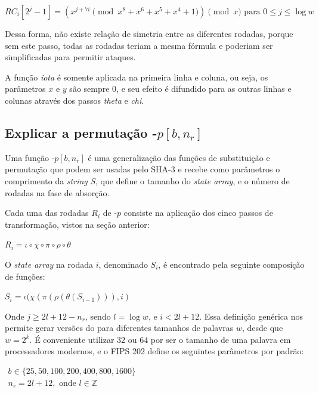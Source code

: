 $RC_{i}[2^{j}-1] = (x^{j+7i} \pmod{x^8 + x^6 + x^5 + x^4 + 1}) \pmod{x} \mbox{ para } 0 \leq j \leq \log w$

Dessa forma, não existe relação de simetria entre as diferentes rodadas, porque
sem este passo, todas as rodadas teriam a mesma fórmula e poderiam ser
simplificadas para permitir ataques.

A função \textit{iota} é somente aplicada na primeira linha e coluna, ou seja,
os parâmetros $x$ e $y$ são sempre 0, e seu efeito é difundido para as outras
linhas e colunas através dos passos \textit{theta} e \textit{chi}.

\subsection{Explicar a permutação \Keccak-$p[b,n_r]$}

Uma função \Keccak-$p[b, n_r]$ é uma generalização das funções de substituição
e permutação \Keccak{} que podem ser usadas pelo SHA-3 e recebe como parâmetros o
comprimento da \textit{string} $S$, que define o tamanho do
\textit{state array}, e o número de rodadas na fase de absorção.

Cada uma das rodadas $R_{i}$ de \Keccak-$p$ consiste na aplicação dos cinco
passos de transformação, vistos na seção anterior:

\begin{center}
    $R_{i} = \iota \circ \chi \circ \pi \circ \rho \circ \theta$
\end{center}

O \textit{state array} na rodada $i$, denominado $S_{i}$, é encontrado pela
seguinte composição de funções:

\begin{center}
    $S_{i} = \iota(\chi(\pi(\rho(\theta(S_{i-1}))), i)$
\end{center}

Onde $j \geq 2l + 12 - n_r$, sendo $l = \log w$, e $i < 2l + 12$. Essa
definição genérica nos permite gerar versões do \Keccak{} para diferentes
tamanhos de palavras $w$, desde que $w = 2^{k}$. É conveniente utilizar $32$ ou
$64$ por ser o tamanho de uma palavra em processadores modernos, e o FIPS 202
define os seguintes parâmetros por padrão:

$\begin{array}{l}
    b \in \{25, 50, 100, 200, 400, 800, 1600\} \\
    n_{r} = 2l + 12, \mbox{ onde } l \in \mathbb{Z}
\end{array}$

